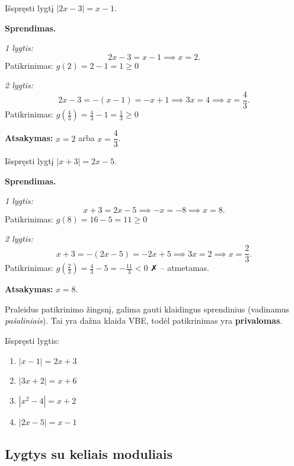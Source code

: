 \begin{example}
Išspręsti lygtį $|2x - 3| = x - 1$.

\textbf{Sprendimas.}

\textit{1 lygtis:}
\[
2x - 3 = x - 1 \implies x = 2.
\]
Patikrinimas: $g(2) = 2 - 1 = 1 \geq 0$ \checkmark

\textit{2 lygtis:}
\[
2x - 3 = -(x - 1) = -x + 1 \implies 3x = 4 \implies x = \frac{4}{3}.
\]
Patikrinimas: $g\!\left(\tfrac{4}{3}\right) = \tfrac{4}{3} - 1 = \tfrac{1}{3} \geq 0$ \checkmark

\textbf{Atsakymas:} $x = 2$ arba $x = \dfrac{4}{3}$.
\end{example}

\begin{example}
Išspręsti lygtį $|x + 3| = 2x - 5$.

\textbf{Sprendimas.}

\textit{1 lygtis:}
\[
x + 3 = 2x - 5 \implies -x = -8 \implies x = 8.
\]
Patikrinimas: $g(8) = 16 - 5 = 11 \geq 0$ \checkmark

\textit{2 lygtis:}
\[
x + 3 = -(2x - 5) = -2x + 5 \implies 3x = 2 \implies x = \frac{2}{3}.
\]
Patikrinimas: $g\!\left(\tfrac{2}{3}\right) = \tfrac{4}{3} - 5 = -\tfrac{11}{3} < 0$ ✗ -- atmetamas.

\textbf{Atsakymas:} $x = 8$.
\end{example}

\begin{remark}
Praleidus patikrinimo žingsnį, galima gauti klaidingus sprendinius (vadinamus \textit{pašaliniais}). Tai yra dažna klaida VBE, todėl patikrinimas yra \textbf{privalomas}.
\end{remark}

\begin{exercise}
Išspręsti lygtis:
\begin{enumerate}[label=\alph*)]
    \item $|x - 1| = 2x + 3$
    \item $|3x + 2| = x + 6$
    \item $|x^2 - 4| = x + 2$
    \item $|2x - 5| = x - 1$
\end{enumerate}
\end{exercise}

\subsection{Lygtys su keliais moduliais}


